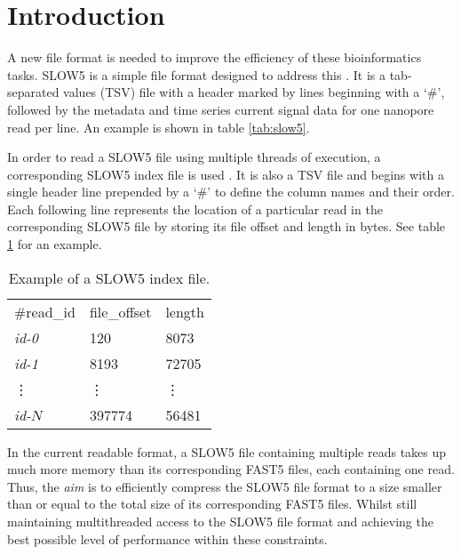 \section{Introduction}
\label{sec:intro}

A new file format is needed to improve the efficiency of these bioinformatics tasks. SLOW5 is a simple file format designed to address this \cite{slow5}. It is a tab-separated values (TSV) file with a header marked by lines beginning with a `\#', followed by the metadata and time series current signal data for one nanopore read per line. An example is shown in table \ref{tab:slow5}.

In order to read a SLOW5 file using multiple threads of execution, a corresponding SLOW5 index file is used \cite{slow5}. It is also a TSV file and begins with a single header line prepended by a `\#' to define the column names and their order. Each following line represents the location of a particular read in the corresponding SLOW5 file by storing its file offset and length in bytes. See table \ref{tab:slow5idx} for an example.

\begin{table}[h!]
    \caption{Example of a SLOW5 index file.\label{tab:slow5idx}}
    \begin{tabular}{|*{3}{l}|}
        \hline
        \#read\_id & file\_offset & length \\
        \textit{id-0} & 120 & 8073 \\
        \textit{id-1} & 8193 & 72705 \\
        \; \vdots & \; \vdots & \;\; \vdots \\
        \textit{id-$N$} & 397774 & 56481 \\
        \hline
    \end{tabular}
\end{table}

In the current readable format, a SLOW5 file containing multiple reads takes up much more memory than its corresponding FAST5 files, each containing one read. Thus, the \textit{aim} is to efficiently compress the SLOW5 file format to a size smaller than or equal to the total size of its corresponding FAST5 files. Whilst still maintaining multithreaded access to the SLOW5 file format and achieving the best possible level of performance within these constraints.
